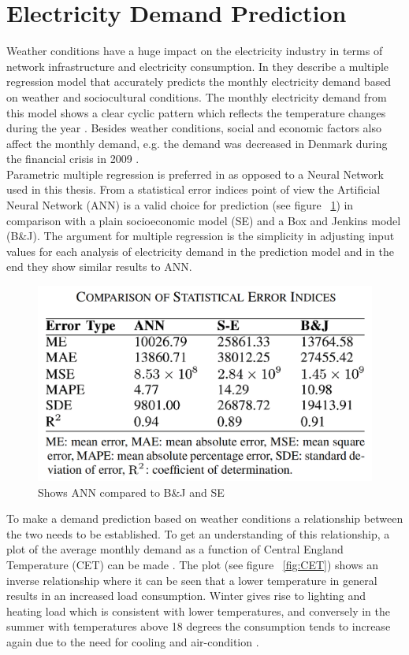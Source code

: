\documentclass[twoside,11pt,openright]{report}
\begin{document}
\section{Electricity Demand Prediction}
Weather conditions have a huge impact on the electricity industry in terms of network infrastructure and electricity consumption. In \cite{19} they describe a multiple regression model that accurately predicts the monthly electricity demand based on weather and sociocultural conditions. The monthly electricity demand from this model shows a clear cyclic pattern which reflects the temperature changes during the year \cite{19}. Besides weather conditions, social and economic factors also affect the monthly demand, e.g. the demand was decreased in Denmark during the financial crisis in 2009 \cite{20}. 
\\[0.5cm]
Parametric multiple regression is preferred in \cite{19} as opposed to a Neural Network used in this thesis. From a statistical error indices point of view the Artificial Neural Network (ANN) is a valid choice for prediction (see figure ~\ref{fig:anncomparison}) in comparison with a plain socioeconomic model (SE) and a Box and Jenkins model (B\&J). The argument for multiple regression is the simplicity in adjusting input values for each analysis of electricity demand in the prediction model and in the end they show similar results to ANN. 
\begin{figure}[h!]
\centering
\includegraphics[width=0.8\linewidth,natwidth=898,natheight=587]{billeder/StatisticalErrorOfNeuralNetworksAndRegression.png}
\caption{Shows ANN compared to B\&J and SE \cite{19} }
\label{fig:anncomparison}
\end{figure}
To make a demand prediction based on weather conditions a relationship between the two needs to be established. To get an understanding of this relationship, a plot of the average monthly demand as a function of Central England Temperature (CET) can be made \cite{19}. The plot (see figure ~\ref{fig:CET}) shows an inverse relationship where it can be seen that a lower temperature in general results in an increased load consumption. Winter gives rise to lighting and heating load which is consistent with lower temperatures, and conversely in the summer with temperatures above 18 degrees the consumption tends to increase again due to the need for cooling and air-condition \cite{19}.
\end{document}
